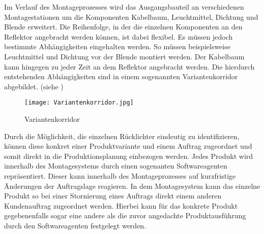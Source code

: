 Im Verlauf des Montageprozesses wird das Ausgangsbauteil an verschiedenen
Montagestationen um die Komponenten Kabelbaum, Leuchtmittel, Dichtung und
Blende erweitert. Die Reihenfolge, in der die einzelnen Komponenten an den
Reflektor angebracht werden können, ist dabei flexibel. Es müssen jedoch
bestimmte Abhängigkeiten eingehalten werden. So müssen beispielsweise 
Leuchtmittel und Dichtung vor der Blende montiert werden. Der Kabelbaum kann
hingegen zu jeder Zeit an dem Reflektor angebracht werden. Die hierdurch
entstehenden Abhängigkeiten sind in einem sogenannten Variantenkorridor
abgebildet. (siehe )

\begin{figure}[htb] 
\centering
\texttt{[image: Variantenkorridor.jpg]}
\caption[Variantenkorridor]{Variantenkorridor\protect\footnotemark}
\label{fig:Variantenkorridor}
\end{figure}

Durch die Möglichkeit, die einzelnen Rücklichter eindeutig zu identifizieren,
können diese konkret einer Produktvariante und einem Auftrag zugeordnet und
somit direkt in die Produktionsplanung einbezogen werden. Jedes Produkt wird
innerhalb des Montagesystems durch einen sogenanten Softwareagenten
repräsentiert. Dieser kann innerhalb des Montageprozesses auf kurzfristige
Änderungen der Auftragslage reagieren. In dem Montagesystem kann das einzelne 
Produkt so bei einer Stornierung eines Auftrags direkt einem anderen
Kundenauftrag zugeordnet werden. Hierbei kann für das konkrete Produkt
gegebenenfalls sogar eine andere als die zuvor angedachte Produktausführung
durch den Softwareagenten festgelegt werden.



